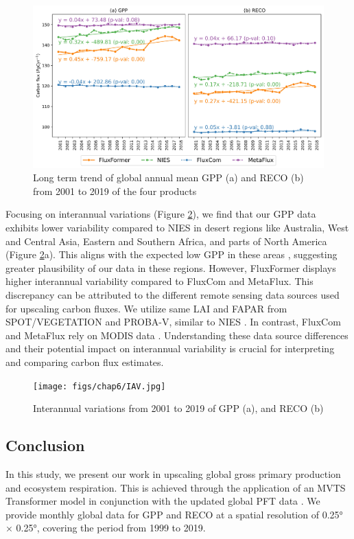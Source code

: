 \begin{figure}[tbh!]
    \centering
    \includegraphics[width=\textwidth]{figs/chap6/global_annual_timeseries.jpg}
    \caption[Long term trend and latitudinal distribution of GPP and RECO]{Long term trend of global annual mean GPP (a) and RECO (b) from 2001 to 2019 of the four products}
    \label{fig:chap6_fig7}
\end{figure}

Focusing on interannual variations (Figure \ref{fig:chap6_fig8}), we find that our GPP data exhibits lower variability compared to NIES in desert regions like Australia, West and Central Asia, Eastern and Southern Africa, and parts of North America (Figure \ref{fig:chap6_fig8}a). This aligns with the expected low GPP in these areas \citep{hadley1981productivity}, suggesting greater plausibility of our data in these regions. However, FluxFormer displays higher interannual variability compared to FluxCom and MetaFlux. This discrepancy can be attributed to the different remote sensing data sources used for upscaling carbon fluxes. We utilize same LAI and FAPAR from SPOT/VEGETATION and PROBA-V, similar to NIES \citep{zeng2020global}. In contrast, FluxCom and MetaFlux rely on MODIS data \citep{jung2019fluxcom, nathaniel2023metaflux}. Understanding these data source differences and their potential impact on interannual variability is crucial for interpreting and comparing carbon flux estimates.\par

\begin{figure}[tbh!]
    \centering
    \texttt{[image: figs/chap6/IAV.jpg]}
    \caption{Interannual variations from 2001 to 2019 of GPP (a), and RECO (b)}
    \label{fig:chap6_fig8}
\end{figure}
\subsection{Conclusion}
In this study, we present our work in upscaling global gross primary production and ecosystem respiration. This is achieved through the application of an MVTS Transformer model \citep{zerveas2021transformer} in conjunction with the updated global PFT data \citep{harper202229}. We provide monthly global data for GPP and RECO at a spatial resolution of 0.25° × 0.25°, covering the period from 1999 to 2019. \par

